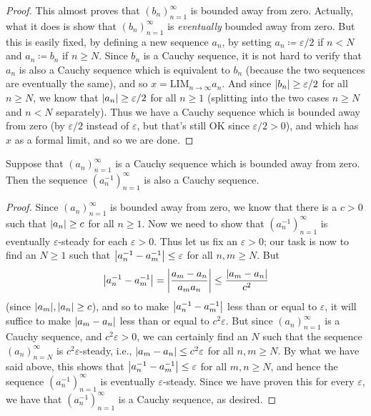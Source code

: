 \begin{proof}
    This almost proves that \((b_n)_{n = 1}^{\infty}\) is bounded away from zero.
    Actually, what it does is show that \((b_n)_{n = 1}^{\infty}\) is \emph{eventually} bounded away from zero.
    But this is easily fixed, by defining a new sequence \(a_n\), by setting \(a_n \coloneqq \varepsilon / 2\) if \(n < N\) and \(a_n \coloneqq b_n\) if \(n \geq N\).
    Since \(b_n\) is a Cauchy sequence, it is not hard to verify that \(a_n\) is also a Cauchy sequence which is equivalent to \(b_n\) (because the two sequences are eventually the same), and so \(x = \text{LIM}_{n \to \infty} a_n\).
    And since \(\abs*{b_n} \geq \varepsilon / 2\) for all \(n \geq N\), we know that \(\abs*{a_n} \geq \varepsilon / 2\) for all \(n \geq 1\) (splitting into the two cases \(n \geq N\) and \(n < N\) separately).
    Thus we have a Cauchy sequence which is bounded away from zero (by \(\varepsilon / 2\) instead of \(\varepsilon\), but that’s still OK since \(\varepsilon / 2 > 0\)), and which has \(x\) as a formal limit, and so we are done.
\end{proof}

\begin{lemma}\label{5.3.15}
    Suppose that \((a_n)_{n = 1}^{\infty}\) is a Cauchy sequence which is bounded away from zero.
    Then the sequence \((a_n^{-1})_{n = 1}^{\infty}\) is also a Cauchy sequence.
\end{lemma}

\begin{proof}
    Since \((a_n)_{n = 1}^{\infty}\) is bounded away from zero, we know that there is a \(c > 0\) such that \(\abs*{a_n} \geq c\) for all \(n \geq 1\).
    Now we need to show that \((a_n^{-1})_{n = 1}^{\infty}\) is eventually \(\varepsilon\)-steady for each \(\varepsilon > 0\).
    Thus let us fix an \(\varepsilon > 0\);
    our task is now to find an \(N \geq 1\) such that \(\abs*{a_n^{-1} - a_m^{-1}} \leq \varepsilon\) for all \(n, m \geq N\).
    But
    \[
        \abs*{a_n^{-1} - a_m^{-1}} = \abs*{\frac{a_m - a_n}{a_m a_n}} \leq \frac{\abs*{a_m - a_n}}{c^2}
    \]
    (since \(\abs*{a_m}, \abs*{a_n} \geq c\)), and so to make \(\abs*{a_n^{-1} - a_m^{-1}}\) less than or equal to \(\varepsilon\), it will suffice to make \(\abs*{a_m - a_n}\) less than or equal to \(c^2 \varepsilon\).
    But since \((a_n)_{n = 1}^{\infty}\) is a Cauchy sequence, and \(c^2 \varepsilon > 0\), we can certainly find an \(N\) such that the sequence \((a_n)_{n = N}^{\infty}\) is \(c^2 \varepsilon\)-steady, i.e., \(\abs*{a_m - a_n} \leq c^2 \varepsilon\) for all \(n, m \geq N\).
    By what we have said above, this shows that \(\abs*{a_n^{-1} - a_m^{-1}} \leq \varepsilon\) for all \(m, n \geq N\), and hence the sequence \((a_n^{-1})_{n = 1}^{\infty}\) is eventually \(\varepsilon\)-steady.
    Since we have proven this for every \(\varepsilon\), we have that \((a_n^{-1})_{n = 1}^{\infty}\) is a Cauchy sequence, as desired.
\end{proof}

